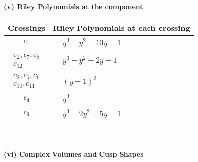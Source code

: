 \documentclass[1p]{elsarticle_modified}
\theoremstyle{definition}
\begin{document}
\newpage\renewcommand{\arraystretch}{1}
\flushleft \textbf{(v) Riley Polynomials at the component}\newline \\
\begin{tabular}{m{50pt}|m{274pt}}
Crossings & \hspace{64pt}Riley Polynomials at each crossing \\
\hline $$\begin{aligned}c_{1}\end{aligned}$$&$\begin{aligned}
&y^3- y^2+10 y-1
\end{aligned}$\\
\hline $$\begin{aligned}c_{2},c_{7},c_{8}\\c_{12}\end{aligned}$$&$\begin{aligned}
&y^3- y^2-2 y-1
\end{aligned}$\\
\hline $$\begin{aligned}c_{3},c_{5},c_{6}\\c_{10},c_{11}\end{aligned}$$&$\begin{aligned}
&(y-1)^3
\end{aligned}$\\
\hline $$\begin{aligned}c_{4}\end{aligned}$$&$\begin{aligned}
&y^3
\end{aligned}$\\
\hline $$\begin{aligned}c_{9}\end{aligned}$$&$\begin{aligned}
&y^3-2 y^2+5 y-1
\end{aligned}$\\
\hline
\end{tabular}\\~\\
\newpage\flushleft \textbf{(vi) Complex Volumes and Cusp Shapes}
\end{document}
